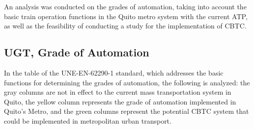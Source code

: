 \documentclass[conference]{IEEEtran}
\begin{document}
An analysis was conducted on the grades of automation, taking into account the basic train operation functions in the Quito metro system with the current ATP, as well as the feasibility of conducting a study for the implementation of CBTC.

\subsection{UGT, Grade of  Automation }

In the table of the UNE-EN-62290-1 standard, which addresses the basic functions for determining the grades of automation, the following is analyzed: the gray columns are not in effect to the current mass transportation system in Quito, the yellow column represents the grade of automation implemented in Quito's Metro, and the green columns represent the potential CBTC system that could be implemented in metropolitan urban transport.
\end{document}
